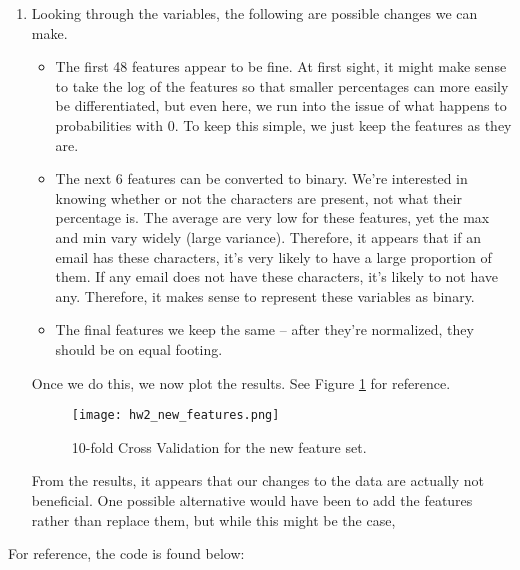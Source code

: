 \documentclass[submit]{harvardml}
\begin{document}
\begin{enumerate}
\item Looking through the variables, the following are possible changes we can make.
\begin{itemize}
\item The first 48 features appear to be fine. At first sight, it might make sense to take the log of the features so that smaller percentages can more easily be differentiated, but even here, we run into the issue of what happens to probabilities with $0$. To keep this simple, we just keep the features as they are.
\item The next 6 features can be converted to binary. We're interested in knowing whether or not the characters are present, not what their percentage is. The average are very low for these features, yet the max and min vary widely (large variance). Therefore, it appears that if an email has these characters, it's very likely to have a large proportion of them. If any email does not have these characters, it's likely to not have any. Therefore, it makes sense to represent these variables as binary.
\item The final features we keep the same -- after they're normalized, they should be on equal footing.
\end{itemize}
Once we do this, we now plot the results. See Figure \ref{fig:new_features} for reference.

\begin{figure}[!h]
\centering
\texttt{[image: hw2\_new\_features.png]}
\caption{10-fold Cross Validation for the new feature set.}
\label{fig:new_features}
\end{figure}

From the results, it appears that our changes to the data are actually not beneficial. One possible alternative would have been to add the features rather than replace them, but while this might be the case,
\end{enumerate}

For reference, the code is found below:

\end{document}
